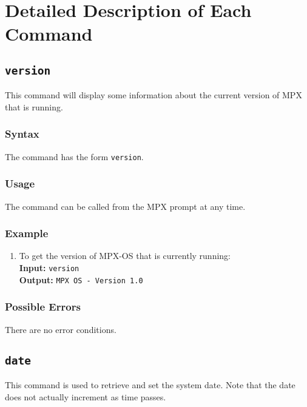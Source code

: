 \chapter{Detailed Description of Each Command}
\label{description_of_commands}

\section{\tt version}
\label{version_cmd}

This command will display some information about the current version of MPX that is
running. 

\subsection{Syntax}
The command has the form {\tt version}.

\subsection{Usage}
The command can be called from the MPX prompt at any time.

\subsection{Example}
\begin{enumerate}
    \item To get the version of MPX-OS that is currently running: \\
        {\bf Input:} {\tt version} \\
        {\bf Output:} {\tt MPX OS - Version 1.0}
\end{enumerate}

\subsection{Possible Errors}
There are no error conditions.








\section{\tt date}
\label{date_cmd}

This command is used to retrieve and set the system date. Note that the date does not
actually increment as time passes.

